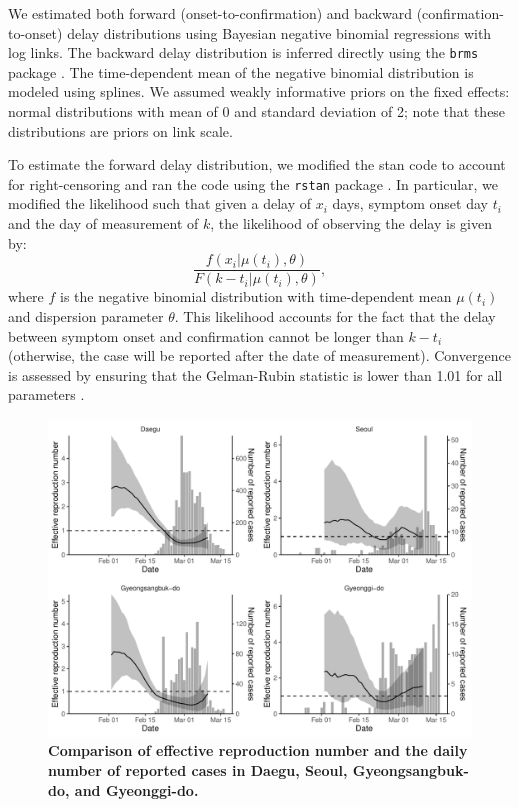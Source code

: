\documentclass[12pt]{article}
\begin{document}
We estimated both forward (onset-to-confirmation) and backward (confirmation-to-onset) delay distributions using Bayesian negative binomial regressions with log links.
The backward delay distribution is inferred directly using the \texttt{brms} package \citep{burkner2017brms}.
The time-dependent mean of the negative binomial distribution is modeled using splines.
We assumed weakly informative priors on the fixed effects: normal distributions with mean of 0 and standard deviation of 2;
note that these distributions are priors on link scale.

To estimate the forward delay distribution, we modified the stan code to account for right-censoring and ran the code using the \texttt{rstan} package \citep{rstan}.
In particular, we modified the likelihood such that given a delay of $x_i$ days, symptom onset day $t_i$ and the day of measurement of $k$, the likelihood of observing the delay is given by:
\begin{equation}
\frac{f(x_i|\mu(t_i), \theta)}{F(k-t_i|\mu(t_i), \theta)},
\end{equation}
where $f$ is the negative binomial distribution with time-dependent mean $\mu(t_i)$ and dispersion parameter $\theta$. This likelihood accounts for the fact that the delay between symptom onset and confirmation cannot be longer than $k-t_i$ (otherwise, the case will be reported after the date of measurement). Convergence is assessed by ensuring that the Gelman-Rubin statistic is lower than 1.01 for all parameters \citep{gelman1992inference}.

\pagebreak

\begin{figure}[!ht]
\includegraphics[width=\textwidth]{figure_R_t_all.pdf}
\caption{
\textbf{Comparison of effective reproduction number and the daily number of reported cases in Daegu, Seoul, Gyeongsangbuk-do, and Gyeonggi-do.}
}
\end{figure}
\end{document}
